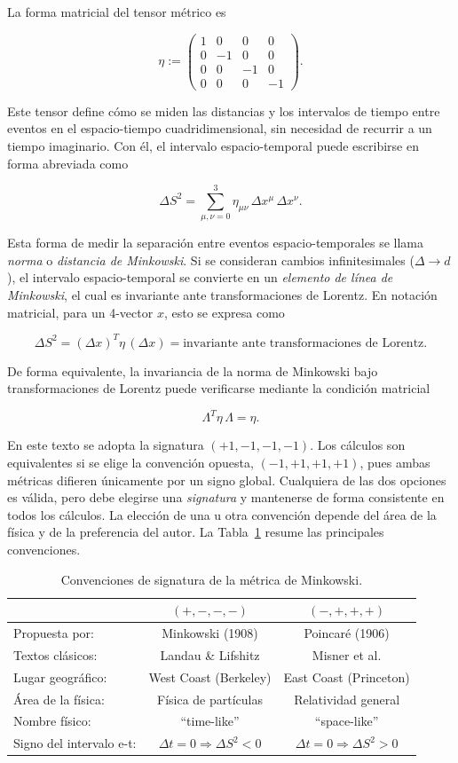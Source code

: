 La forma matricial del tensor métrico es

$$
\eta :=
\begin{pmatrix}
1 & 0 & 0 & 0 \\
0 & -1 & 0 & 0 \\
0 & 0 & -1 & 0 \\
0 & 0 & 0 & -1
\end{pmatrix}.
$$

Este tensor define cómo se miden las distancias y los intervalos de tiempo entre eventos en el espacio-tiempo cuadridimensional, sin necesidad de recurrir a un tiempo imaginario. Con él, el intervalo espacio-temporal puede escribirse en forma abreviada como

$$
\Delta S^2 = \sum_{\mu,\nu=0}^{3} \eta_{\mu\nu}\, \Delta x^\mu\, \Delta x^\nu.
$$

Esta forma de medir la separación entre eventos espacio-temporales se llama \emph{norma} o \emph{distancia de Minkowski}. Si se consideran cambios infinitesimales ($\Delta \to d$), el intervalo espacio-temporal se convierte en un \emph{elemento de línea de Minkowski}, el cual es invariante ante transformaciones de Lorentz. En notación matricial, para un 4-vector $x$, esto se expresa como

$$
\Delta S^2 = (\Delta x)^T\eta\,(\Delta x)
= \text{invariante ante transformaciones de Lorentz}.
$$

De forma equivalente, la invariancia de la norma de Minkowski bajo transformaciones de Lorentz puede verificarse mediante la condición matricial

$$
\Lambda^T \eta\, \Lambda = \eta.
$$

En este texto se adopta la signatura $(+1,-1,-1,-1)$. Los cálculos son equivalentes si se elige la convención opuesta, $(-1,+1,+1,+1)$, pues ambas métricas difieren únicamente por un signo global. Cualquiera de las dos opciones es válida, pero debe elegirse una \emph{signatura} y mantenerse de forma consistente en todos los cálculos. La elección de una u otra convención depende del área de la física y de la preferencia del autor. La Tabla~\ref{tab:signatura} resume las principales convenciones.

\begin{table}[h]
\centering
\caption{Convenciones de signatura de la métrica de Minkowski.}
\label{tab:signatura}
\begin{tabular}{l|c|c}
 & $(+,-,-,-)$ & $(-,+,+,+)$ \\ \hline
Propuesta por: & Minkowski (1908) & Poincaré (1906) \\
Textos clásicos: & Landau \& Lifshitz & Misner et al. \\
Lugar geográfico: & West Coast (Berkeley) & East Coast (Princeton) \\
Área de la física: & Física de partículas & Relatividad general \\
Nombre físico: & ``time-like'' & ``space-like'' \\
Signo del intervalo e-t: & $\Delta t = 0 \Rightarrow \Delta S^2 < 0$ & $\Delta t = 0 \Rightarrow \Delta S^2 > 0$
\end{tabular}
\end{table}

